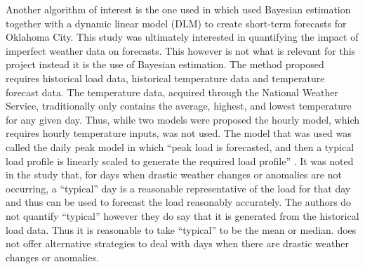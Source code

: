 Another algorithm of interest is the one used in \citet{douglas98} which used Bayesian estimation together with a dynamic linear model (DLM) to create short-term forecasts for Oklahoma City. This study was ultimately interested in quantifying the impact of imperfect weather data on forecasts. This however is not what is relevant for this project instead it is the use of Bayesian estimation. %
The method proposed requires historical load data, historical temperature data and temperature forecast data. The temperature data, acquired through the National Weather Service, traditionally only contains the average, highest, and lowest temperature for any given day. Thus, while two models were proposed the hourly model, which requires hourly temperature inputs, was not used. The model that was used was called the daily peak model in which ``peak load is forecasted, and then a typical load profile is linearly scaled to generate the required load profile'' \citep{douglas98}. It was noted in the study that, for days when drastic weather changes or anomalies are not occurring, a ``typical'' day is a reasonable representative of the load for that day and thus can be used to forecast the load reasonably accurately. The authors do not quantify ``typical'' however they do say that it is generated from the historical load data. Thus it is reasonable to take ``typical'' to be the mean or median. \cite{douglas98} does not offer alternative strategies to deal with days when there are drastic weather changes or anomalies. %
